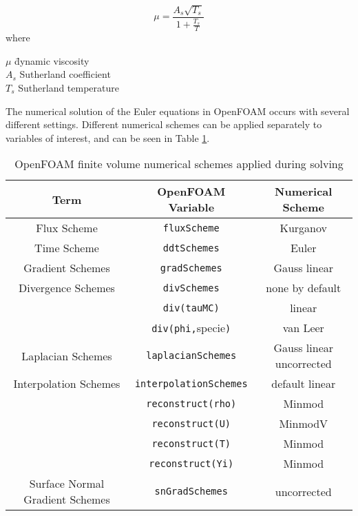 \begin{equation}
\mu = \frac{A_s \sqrt{T_s}}{1 + \frac{T_s}{T}} 
\end{equation}
where
\begin{tabbing}
\qquad \= \(\mu\) \qquad \= dynamic viscosity\\ 
\> \(A_s\) \> Sutherland coefficient \\
\> \(T_s\) \> Sutherland temperature\\
\end{tabbing}
The numerical solution of the Euler equations in OpenFOAM occurs with several different settings. Different numerical schemes can be applied separately to variables of interest, and can be seen in Table \ref{tab:numschemes}. 

\begin{table}[h]
\centering
\caption{OpenFOAM finite volume numerical schemes applied during solving}
\label{tab:numschemes}
\begin{tabular}{ccc}
Term & OpenFOAM Variable & Numerical Scheme \\ \hline 
Flux Scheme & \verb|fluxScheme| & Kurganov \\ 
Time Scheme & \verb|ddtSchemes| & Euler \\
Gradient Schemes & \verb|gradSchemes| & Gauss linear \\ 
Divergence Schemes & \verb|divSchemes| & none by default \\ 
& \verb|div(tauMC)| & linear \\ 
& \verb|div(phi,|specie\verb|)| & van Leer \\ 
Laplacian Schemes & \verb|laplacianSchemes| & Gauss linear uncorrected \\ 
Interpolation Schemes & \verb|interpolationSchemes| & default linear \\
& \verb|reconstruct(rho)| & Minmod \\ 
& \verb|reconstruct(U)| & MinmodV \\ 
& \verb|reconstruct(T)| & Minmod \\ 
& \verb|reconstruct(Yi)| & Minmod \\ 
Surface Normal Gradient Schemes & \verb|snGradSchemes| & uncorrected \\
\end{tabular}
\end{table}
